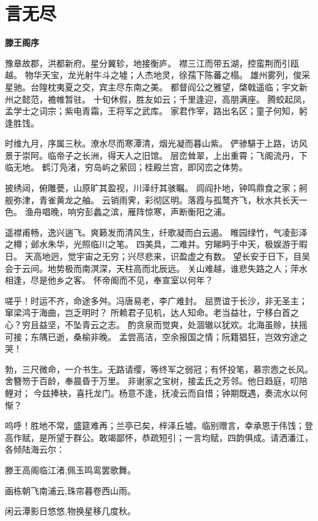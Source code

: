 \documentclass[UTF8,oneside]{ctexbook}
\begin{document}
\section{言无尽}
\mfApache \quad \quad\quad\quad\quad \quad\quad\quad \quad\quad\textbf{滕王阁序}

豫章故郡，洪都新府。星分翼轸，地接衡庐。
襟三江而带五湖，控蛮荆而引瓯越。
物华天宝，龙光射牛斗之墟；人杰地灵，徐孺下陈蕃之榻。
雄州雾列，俊采星驰。台隍枕夷夏之交，宾主尽东南之美。
都督阎公之雅望，棨戟遥临；宇文新州之懿范，襜帷暂驻。
十旬休假，胜友如云；千里逢迎，高朋满座。
腾蛟起凤，孟学士之词宗；紫电青霜，王将军之武库。
家君作宰，路出名区；童子何知，躬逢胜饯。

时维九月，序属三秋。潦水尽而寒潭清，烟光凝而暮山紫。
俨骖騑于上路，访风景于崇阿。临帝子之长洲，得天人之旧馆。
层峦耸翠，上出重霄；飞阁流丹，下临无地。
鹤汀凫渚，穷岛屿之萦回；桂殿兰宫，即冈峦之体势。

披绣闼，俯雕甍，山原旷其盈视，川泽纡其骇瞩。
闾阎扑地，钟鸣鼎食之家；舸舰弥津，青雀黄龙之舳。
云销雨霁，彩彻区明。落霞与孤鹜齐飞，秋水共长天一色。
渔舟唱晚，响穷彭蠡之滨，雁阵惊寒，声断衡阳之浦。

遥襟甫畅，逸兴遄飞。爽籁发而清风生，纤歌凝而白云遏。
睢园绿竹，气凌彭泽之樽；邺水朱华，光照临川之笔。
四美具，二难并。穷睇眄于中天，极娱游于暇日。
天高地迥，觉宇宙之无穷；兴尽悲来，识盈虚之有数。
望长安于日下，目吴会于云间。地势极而南溟深，天柱高而北辰远。
关山难越，谁悲失路之人；萍水相逢，尽是他乡之客。
怀帝阍而不见，奉宣室以何年？

嗟乎！时运不齐，命途多舛。冯唐易老，李广难封。
屈贾谊于长沙，非无圣主；窜梁鸿于海曲，岂乏明时？
所赖君子见机，达人知命。老当益壮，宁移白首之心？穷且益坚，不坠青云之志。
酌贪泉而觉爽，处涸辙以犹欢。北海虽赊，扶摇可接；东隅已逝，桑榆非晚。
孟尝高洁，空余报国之情；阮籍猖狂，岂效穷途之哭！

勃，三尺微命，一介书生。无路请缨，等终军之弱冠；有怀投笔，慕宗悫之长风。
舍簪笏于百龄，奉晨昏于万里。
非谢家之宝树，接孟氏之芳邻。他日趋庭，叨陪鲤对；
今兹捧袂，喜托龙门。杨意不逢，抚凌云而自惜；钟期既遇，奏流水以何惭？

呜呼！胜地不常，盛筵难再；兰亭已矣，梓泽丘墟。临别赠言，幸承恩于伟饯；登高作赋，是所望于群公。敢竭鄙怀，恭疏短引；一言均赋，四韵俱成。请洒潘江，各倾陆海云尔：

\quad \quad 滕王高阁临江渚,佩玉鸣鸾罢歌舞。

\quad \quad 画栋朝飞南浦云,珠帘暮卷西山雨。

\quad \quad 闲云潭影日悠悠,物换星移几度秋。
\end{document}
